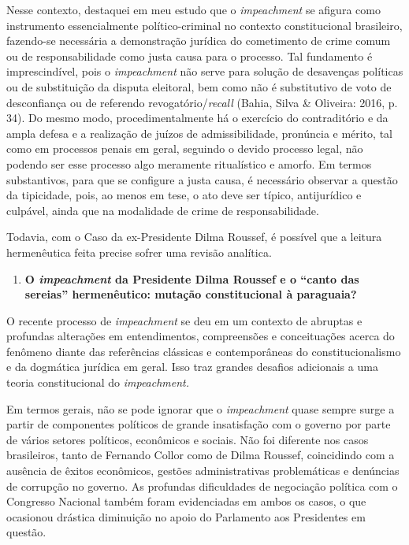 Nesse contexto, destaquei em meu estudo que o \emph{impeachment} se
afigura como instrumento essencialmente político-criminal no contexto
constitucional brasileiro, fazendo-se necessária a demonstração jurídica
do cometimento de crime comum ou de responsabilidade como justa causa
para o processo. Tal fundamento é imprescindível, pois o
\emph{impeachment} não serve para solução de desavenças políticas ou de
substituição da disputa eleitoral, bem como não é substitutivo de voto
de desconfiança ou de referendo revogatório/\emph{recall} (Bahia, Silva
\& Oliveira: 2016, p. 34). Do mesmo modo, procedimentalmente há o
exercício do contraditório e da ampla defesa e a realização de juízos de
admissibilidade, pronúncia e mérito, tal como em processos penais em
geral, seguindo o devido processo legal, não podendo ser esse processo
algo meramente ritualístico e amorfo. Em termos substantivos, para que
se configure a justa causa, é necessário observar a questão da
tipicidade, pois, ao menos em tese, o ato deve ser típico, antijurídico
e culpável, ainda que na modalidade de crime de responsabilidade.

Todavia, com o Caso da ex-Presidente Dilma Roussef, é possível que a
leitura hermenêutica feita precise sofrer uma revisão analítica.

\begin{enumerate}
\def\labelenumi{\arabic{enumi}.}
\item
  \textbf{O \emph{impeachment} da Presidente Dilma Roussef e o ``canto
  das sereias'' hermenêutico: mutação constitucional à paraguaia?}
\end{enumerate}

O recente processo de \emph{impeachment} se deu em um contexto de
abruptas e profundas alterações em entendimentos, compreensões e
conceituações acerca do fenômeno diante das referências clássicas e
contemporâneas do constitucionalismo e da dogmática jurídica em geral.
Isso traz grandes desafios adicionais a uma teoria constitucional do
\emph{impeachment.}

Em termos gerais, não se pode ignorar que o \emph{impeachment} quase
sempre surge a partir de componentes políticos de grande insatisfação
com o governo por parte de vários setores políticos, econômicos e
sociais. Não foi diferente nos casos brasileiros, tanto de Fernando
Collor como de Dilma Roussef, coincidindo com a ausência de êxitos
econômicos, gestões administrativas problemáticas e denúncias de
corrupção no governo. As profundas dificuldades de negociação política
com o Congresso Nacional também foram evidenciadas em ambos os casos, o
que ocasionou drástica diminuição no apoio do Parlamento aos Presidentes
em questão.

